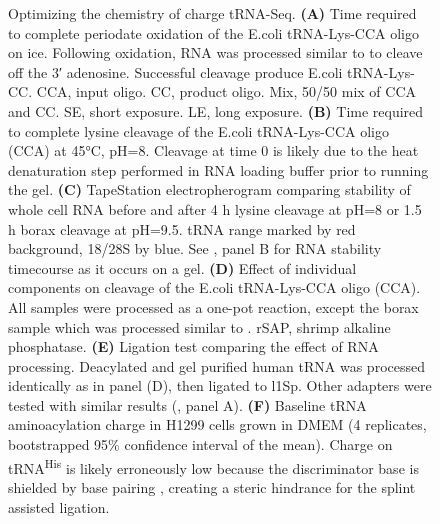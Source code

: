 \documentclass[9pt,lineno]{elife}
\begin{document}
\begin{figure}[ht!]
\centering
{}
\caption{
Optimizing the chemistry of charge tRNA-Seq.
\textbf{(A)} Time required to complete periodate oxidation of the E.coli tRNA-Lys-CCA oligo on ice.
Following oxidation, RNA was processed similar to \cite{Evans2017-st} to cleave off the 3′ adenosine.
Successful cleavage produce E.coli tRNA-Lys-CC.
CCA, input oligo.
CC, product oligo.
Mix, 50/50 mix of CCA and CC.
SE, short exposure.
LE, long exposure.
\textbf{(B)} Time required to complete lysine cleavage of the E.coli tRNA-Lys-CCA oligo (CCA) at 45°C, pH=8.
Cleavage at time 0 is likely due to the heat denaturation step performed in RNA loading buffer prior to running the gel.
\textbf{(C)} TapeStation electropherogram comparing stability of whole cell RNA before and after 4 h lysine cleavage at pH=8 or 1.5 h borax cleavage at pH=9.5.
tRNA range marked by red background, 18/28S by blue.
See , panel B for RNA stability timecourse as it occurs on a gel.
\textbf{(D)} Effect of individual components on cleavage of the E.coli tRNA-Lys-CCA oligo (CCA).
All samples were processed as a one-pot reaction, except the borax sample which was processed similar to \cite{Evans2017-st}.
rSAP, shrimp alkaline phosphatase.
\textbf{(E)} Ligation test comparing the effect of RNA processing.
Deacylated and gel purified human tRNA was processed identically as in panel (D), then ligated to l1Sp.
Other adapters were tested with similar results (, panel A).
\textbf{(F)} Baseline tRNA aminoacylation charge in H1299 cells grown in DMEM (4 replicates, bootstrapped 95\% confidence interval of the mean).
Charge on tRNA\textsuperscript{His} is likely erroneously low because the discriminator base is shielded by base pairing \citep{Heinemann2012-hq}, creating a steric hindrance for the splint assisted ligation.
}
\label{fig:Fig2}


\end{figure}
\end{document}

